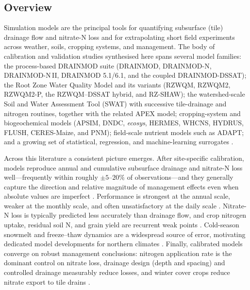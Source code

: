 \subsection{Overview}

Simulation models are the principal tools for quantifying subsurface (tile) drainage flow and nitrate-N loss and for extrapolating short field experiments across weather, soils, cropping systems, and management. The body of calibration and validation studies synthesised here spans several model families: the process-based DRAINMOD suite (DRAINMOD, DRAINMOD-N, DRAINMOD-N\,II, DRAINMOD 5.1/6.1, and the coupled DRAINMOD-DSSAT); the Root Zone Water Quality Model and its variants (RZWQM, RZWQM2, RZWQM2-P, the RZWQM--DSSAT hybrid, and RZ-SHAW); the watershed-scale Soil and Water Assessment Tool (SWAT) with successive tile-drainage and nitrogen routines, together with the related APEX model; cropping-system and biogeochemical models (APSIM, DNDC, \textit{ecosys}, HERMES, WHCNS, HYDRUS, FLUSH, CERES-Maize, and PNM); field-scale nutrient models such as ADAPT; and a growing set of statistical, regression, and machine-learning surrogates \parencite{Ma2001,David2009,Luo2010,Fang2012,Negm2014,Smith2020}.

Across this literature a consistent picture emerges. After site-specific calibration, models reproduce annual and cumulative subsurface drainage and nitrate-N loss well---frequently within roughly $\pm5$--$20\%$ of observations---and they generally capture the direction and relative magnitude of management effects even when absolute values are imperfect \parencite{Feyereisen2007,Youssef2006,Singh2020b,Dayyani2010}. Performance is strongest at the annual scale, weaker at the monthly scale, and often unsatisfactory at the daily scale \parencite{Liang2018,Ikenberry2017,Marjerison2016,Ojeda2018}. Nitrate-N loss is typically predicted less accurately than drainage flow, and crop nitrogen uptake, residual soil N, and grain yield are recurrent weak points \parencite{Ma2007,Ahuja2007,Malone2007c}. Cold-season snowmelt and freeze--thaw dynamics are a widespread source of error, motivating dedicated model developments for northern climates \parencite{Wang2006c,Dayyani2010b,Yang2007,Salazar2009}. Finally, calibrated models converge on robust management conclusions: nitrogen application rate is the dominant control on nitrate loss, drainage design (depth and spacing) and controlled drainage measurably reduce losses, and winter cover crops reduce nitrate export to tile drains \parencite{Davis2000,Moriasi2013,Fang2012,Malone2017}.

